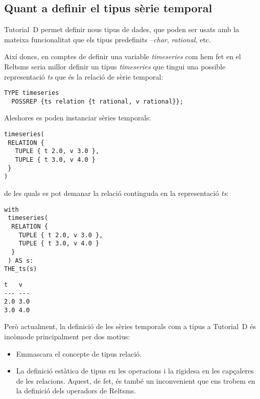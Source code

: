 \subsection{Quant a definir el tipus sèrie temporal}
\label{sec:implementacio:tipus-relacional}




Tutorial~D permet definir nous tipus de dades, que poden ser usats amb
la mateixa funcionalitat que els tipus predefinits --\emph{char},
\emph{rational}, etc.  

Així doncs, en comptes de definir una variable \emph{timeseries} com
hem fet en el Reltsms seria millor definir un tipus \emph{timeseries}
que tingui una possible representació \emph{ts} que és la relació de
sèrie temporal:
\begin{lstlisting}[style=tutorialD]
TYPE timeseries
  POSSREP {ts relation {t rational, v rational}};
\end{lstlisting}


Aleshores es poden instanciar sèries temporals:
\begin{lstlisting}[style=tutorialD]
timeseries(
 RELATION {
   TUPLE { t 2.0, v 3.0 },
   TUPLE { t 3.0, v 4.0 }
 }
)
\end{lstlisting}

de les quals es pot demanar la relació continguda en la representació \emph{ts}:
\begin{lstlisting}[style=tutorialD]
with
 timeseries(
  RELATION {
    TUPLE { t 2.0, v 3.0 },
    TUPLE { t 3.0, v 4.0 }
  }
 ) AS s:
THE_ts(s)
\end{lstlisting}
\begin{lstlisting}[style=stdout]
 t   v 
--- ---
2.0 3.0
3.0 4.0
\end{lstlisting}


Però actualment, la definició de les sèries temporals com a tipus a
Tutorial~D és incòmode principalment per dos motius:
\begin{itemize}
\item Emmascara el concepte de tipus relació.  %

\item La definició estàtica de tipus en les operacions i la rigidesa
  en les capçaleres de les relacions. Aquest, de fet, és també un
  inconvenient que ens trobem en la definició dels operadors de
  Reltsms.  %
\end{itemize}



